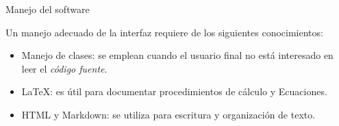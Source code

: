 \begin{frame}[t]{Manejo del software}\vspace{10pt}

Un manejo adecuado de la interfaz requiere de los siguientes conocimientos:

\begin{itemize}
	\item Manejo de clases: se emplean cuando el usuario final no est\'a interesado en leer el \textit{c\'odigo fuente}.
	\item \LaTeX: es \'util para documentar procedimientos de cálculo y Ecuaciones.
	\item HTML y Markdown: se utiliza para escritura y organizaci\'on de texto.
\end{itemize}

\end{frame}
